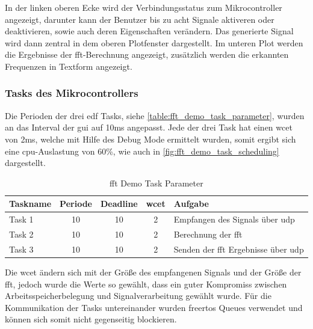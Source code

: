\documentclass[../EDF Master Thesis.tex]{subfiles}
\begin{document}
        In der linken oberen Ecke wird der Verbindungsstatus zum Mikrocontroller angezeigt, darunter kann der Benutzer bis zu acht Signale aktiveren oder deaktivieren, sowie auch deren Eigenschaften verändern.
        Das generierte Signal wird dann zentral in dem oberen Plotfenster dargestellt.
        Im unteren Plot werden die Ergebnisse der \ac{fft}-Berechnung angezeigt, zusätzlich werden die erkannten Frequenzen in Textform angezeigt.

        \subsubsection{Tasks des Mikrocontrollers}
            Die Perioden der drei \ac{edf} Tasks, siehe \autoref{table:fft_demo_task_parameter}, wurden an das Interval der \ac{gui} auf 10ms angepasst.
            Jede der drei Task hat einen \ac{wcet} von 2ms, welche mit Hilfe des Debug Mode ermittelt wurden, somit ergibt sich eine \ac{cpu}-Auslastung von 60\%, wie auch in \autoref{fig:fft_demo_task_scheduling} dargestellt.

            \begin{table}[ht!]
                \centering
                \begin{tabular}{l|c|c|c|l}
                    Taskname & Periode & Deadline & \ac{wcet} & Aufgabe \\
                    \hline
                    Task 1 & 10 & 10 & 2 & Empfangen des Signals über \ac{udp}\\
                    Task 2 & 10 & 10 & 2 & Berechnung der \ac{fft}\\
                    Task 3 & 10 & 10 & 2 & Senden der \ac{fft} Ergebnisse über \ac{udp}
                \end{tabular}
                \caption{\ac{fft} Demo Task Parameter}
                \label{table:fft_demo_task_parameter}
            \end{table}

            Die \ac{wcet} ändern sich mit der Größe des empfangenen Signals und der Größe der \ac{fft}, jedoch wurde die Werte so gewählt, dass ein guter Kompromiss zwischen Arbeitsspeicherbelegung und Signalverarbeitung gewählt wurde.
            Für die Kommunikation der Tasks untereinander wurden \ac{freertos} Queues verwendet und können sich somit nicht gegenseitig blockieren.
\end{document}
